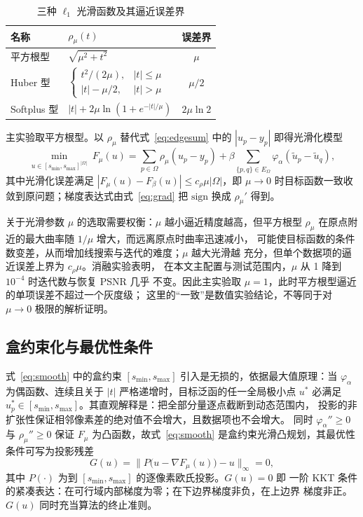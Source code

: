 \documentclass[withoutpreface,bwprint]{cumcmthesis}
\begin{document}
\begin{table}[!htbp]
  \centering\small
  \caption{三种 $\ell_1$ 光滑函数及其逼近误差界}
  \label{tab:rho}
  \begin{tabular}{llc}
    \toprule[1.5pt]
    名称 & $\rho_{\mu}(t)$ & 误差界 \\
    \midrule[1pt]
    平方根型 & $\sqrt{\mu^{2}+t^{2}}$ & $\mu$ \\
    Huber 型 & $\begin{cases}t^{2}/(2\mu), & |t|\le\mu\\ |t|-\mu/2, & |t|>\mu\end{cases}$ & $\mu/2$ \\
    Softplus 型 & $|t|+2\mu\ln(1+e^{-|t|/\mu})$ & $2\mu\ln 2$ \\
    \bottomrule[1.5pt]
  \end{tabular}
\end{table}

主实验取平方根型。以 $\rho_{\mu}$ 替代式~\eqref{eq:edgesum} 中的 $|u_p-y_p|$
即得光滑化模型
\begin{equation}
  \min_{u\in[s_{\min},s_{\max}]^{|\Omega|}}\ F_{\mu}(u)
  =\sum_{p\in\Omega}\rho_{\mu}(u_p-y_p)
  +\beta\sum_{\{p,q\}\in E_{\Omega}}\varphi_{\alpha}(\tilde u_p-\tilde u_q),
  \label{eq:smooth}
\end{equation}
其中光滑化误差满足 $|F_{\mu}(u)-F_{\beta}(u)|\le c_{\rho}\mu|\Omega|$，即
$\mu\to0$ 时目标函数一致收敛到原问题；梯度表达式由式~\eqref{eq:grad} 把
$\mathrm{sign}$ 换成 $\rho_{\mu}'$ 得到。

关于光滑参数 $\mu$ 的选取需要权衡：$\mu$ 越小逼近精度越高，但平方根型
$\rho_{\mu}$ 在原点附近的最大曲率随 $1/\mu$ 增大，而远离原点时曲率迅速减小，
可能使目标函数的条件数变差，从而增加线搜索与迭代的难度；$\mu$ 越大光滑越
充分，但单个数据项的逼近误差上界为 $c_{\rho}\mu$。消融实验表明，
在本文主配置与测试范围内，$\mu$ 从 1 降到 $10^{-4}$ 时迭代数与恢复 PSNR 几乎
不变。因此主实验取 $\mu=1$，此时平方根型逼近的单项误差不超过一个灰度级；
这里的“一致”是数值实验结论，不等同于对 $\mu\to0$ 极限的解析证明。

\subsection{盒约束化与最优性条件}

式~\eqref{eq:smooth} 中的盒约束 $[s_{\min},s_{\max}]$ 引入是无损的，依据最大值原理\cite{cai2007}：当 $\varphi_{\alpha}$ 为偶函数、连续且关于
$|t|$ 严格递增时，目标泛函的任一全局极小点 $u^*$ 必满足
$u_p^{*}\in[s_{\min},s_{\max}]$。其直观解释是：把全部分量逐点截断到动态范围内，
投影的非扩张性保证相邻像素差的绝对值不会增大，且数据项也不会增大。
同时 $\varphi_{\alpha}''\ge0$ 与 $\rho_{\mu}''\ge0$
保证 $F_{\mu}$ 为凸函数，故式~\eqref{eq:smooth} 是盒约束光滑凸规划，其最优性
条件可写为投影残差
\begin{equation}
  G(u)=\big\|P\big(u-\nabla F_{\mu}(u)\big)-u\big\|_{\infty}=0,
\end{equation}
其中 $P(\cdot)$ 为到 $[s_{\min},s_{\max}]$ 的逐像素欧氏投影。$G(u)=0$ 即
一阶 KKT 条件的紧凑表达：在可行域内部梯度为零；在下边界梯度非负，在上边界
梯度非正。
$G(u)$ 同时充当算法的终止准则。
\end{document}
